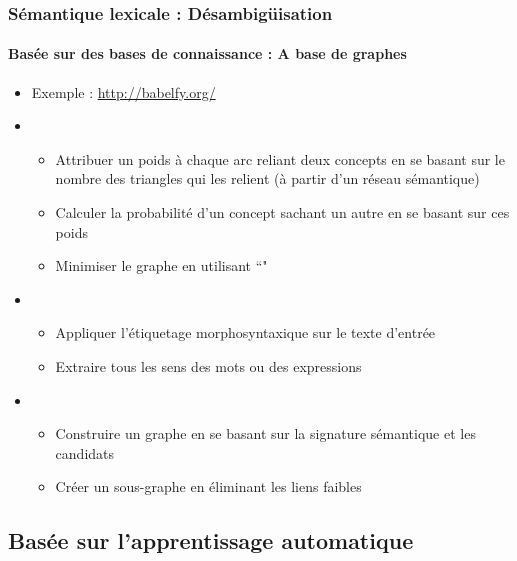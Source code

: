 \documentclass[xcolor=table]{beamer}
\begin{document}
\begin{frame}
\frametitle{Sémantique lexicale : Désambigüisation}
\framesubtitle{Basée sur des bases de connaissance : A base de graphes}
	
\begin{itemize}
	\item Exemple : \url{http://babelfy.org/} \cite{2014-moro-al}
	\item {}
	\begin{itemize}
		\item Attribuer un poids à chaque arc reliant deux concepts en se basant sur le nombre des triangles qui les relient (à partir d'un réseau sémantique)
		\item Calculer la probabilité d'un concept sachant un autre en se basant sur ces poids
		\item Minimiser le graphe en utilisant ``"
	\end{itemize}
	\item {}
	\begin{itemize}
		\item Appliquer l'étiquetage morphosyntaxique sur le texte d'entrée
		\item Extraire tous les sens des mots ou des expressions
	\end{itemize}
	\item {}
	\begin{itemize}
		\item Construire un graphe en se basant sur la signature sémantique et les candidats
		\item Créer un sous-graphe en éliminant les liens faibles
	\end{itemize}
\end{itemize}

\end{frame}

\subsection{Basée sur l'apprentissage automatique}
\end{document}
